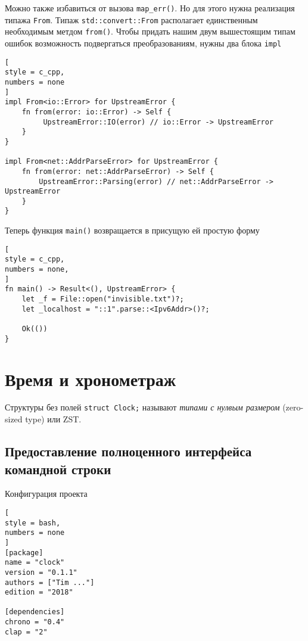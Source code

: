 \documentclass[%
	11pt,
	a4paper,
	utf8,
		]{article}
\begin{document}
Можно также избавиться от вызова \verb|map_err()|. Но для этого нужна реализация типажа \verb|From|. Типаж \verb|std::convert::From| располагает единственным необходимым метдом \verb|from()|. Чтобы придать нашим двум вышестоящим типам ошибок возможность подвергаться преобразованиям, нужны два блока \verb|impl|
\begin{lstlisting}[
style = c_cpp,
numbers = none
]
impl From<io::Error> for UpstreamError {
    fn from(error: io::Error) -> Self {
         UpstreamError::IO(error) // io::Error -> UpstreamError
    }
} 

impl From<net::AddrParseError> for UpstreamError {
    fn from(error: net::AddrParseError) -> Self {
        UpstreamError::Parsing(error) // net::AddrParseError -> UpstreamError
    }
}
\end{lstlisting}

Теперь функция \verb|main()| возвращается в присущую ей простую форму
\begin{lstlisting}[
style = c_cpp,
numbers = none,
]
fn main() -> Result<(), UpstreamError> {
    let _f = File::open("invisible.txt")?;
    let _localhost = "::1".parse::<Ipv6Addr>()?;
    
    Ok(())
}
\end{lstlisting}

\section{Время и хронометраж}

Структуры без полей \verb|struct Clock;| называют \emph{типами с нулвым размером} (zero-sized type) или ZST.

\subsection{Предоставление полноценного интерфейса командной строки}

Конфигурация проекта
\begin{lstlisting}[
style = bash,
numbers = none
]
[package]
name = "clock"
version = "0.1.1"
authors = ["Tim ..."]
edition = "2018"

[dependencies]
chrono = "0.4"
clap = "2"
\end{lstlisting}
\end{document}
